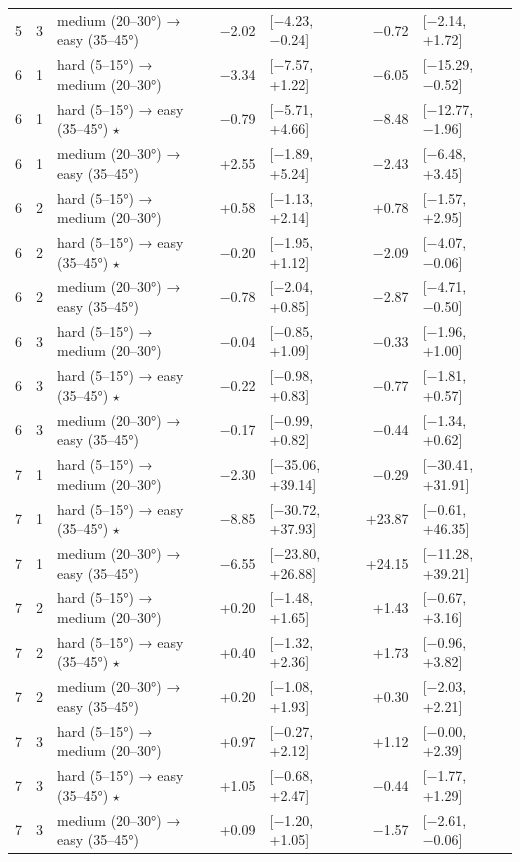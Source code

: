 \begin{table}[htbp]
\begin{tabular}{rllrlrl}
    5 & 3 & medium (20–30°) → easy (35–45°) & −2.02 & [−4.23, −0.24] & −0.72 & [−2.14, +1.72] \\
    6 & 1 & hard (5–15°) → medium (20–30°) & −3.34 & [−7.57, +1.22] & −6.05 & [−15.29, −0.52] \\
    6 & 1 & hard (5–15°) → easy (35–45°) $\star$ & −0.79 & [−5.71, +4.66] & −8.48 & [−12.77, −1.96] \\
    6 & 1 & medium (20–30°) → easy (35–45°) & +2.55 & [−1.89, +5.24] & −2.43 & [−6.48, +3.45] \\
    6 & 2 & hard (5–15°) → medium (20–30°) & +0.58 & [−1.13, +2.14] & +0.78 & [−1.57, +2.95] \\
    6 & 2 & hard (5–15°) → easy (35–45°) $\star$ & −0.20 & [−1.95, +1.12] & −2.09 & [−4.07, −0.06] \\
    6 & 2 & medium (20–30°) → easy (35–45°) & −0.78 & [−2.04, +0.85] & −2.87 & [−4.71, −0.50] \\
    6 & 3 & hard (5–15°) → medium (20–30°) & −0.04 & [−0.85, +1.09] & −0.33 & [−1.96, +1.00] \\
    6 & 3 & hard (5–15°) → easy (35–45°) $\star$ & −0.22 & [−0.98, +0.83] & −0.77 & [−1.81, +0.57] \\
    6 & 3 & medium (20–30°) → easy (35–45°) & −0.17 & [−0.99, +0.82] & −0.44 & [−1.34, +0.62] \\
    7 & 1 & hard (5–15°) → medium (20–30°) & −2.30 & [−35.06, +39.14] & −0.29 & [−30.41, +31.91] \\
    7 & 1 & hard (5–15°) → easy (35–45°) $\star$ & −8.85 & [−30.72, +37.93] & +23.87 & [−0.61, +46.35] \\
    7 & 1 & medium (20–30°) → easy (35–45°) & −6.55 & [−23.80, +26.88] & +24.15 & [−11.28, +39.21] \\
    7 & 2 & hard (5–15°) → medium (20–30°) & +0.20 & [−1.48, +1.65] & +1.43 & [−0.67, +3.16] \\
    7 & 2 & hard (5–15°) → easy (35–45°) $\star$ & +0.40 & [−1.32, +2.36] & +1.73 & [−0.96, +3.82] \\
    7 & 2 & medium (20–30°) → easy (35–45°) & +0.20 & [−1.08, +1.93] & +0.30 & [−2.03, +2.21] \\
    7 & 3 & hard (5–15°) → medium (20–30°) & +0.97 & [−0.27, +2.12] & +1.12 & [−0.00, +2.39] \\
    7 & 3 & hard (5–15°) → easy (35–45°) $\star$ & +1.05 & [−0.68, +2.47] & −0.44 & [−1.77, +1.29] \\
    7 & 3 & medium (20–30°) → easy (35–45°) & +0.09 & [−1.20, +1.05] & −1.57 & [−2.61, −0.06] \\

\end{tabular}
\end{table}
